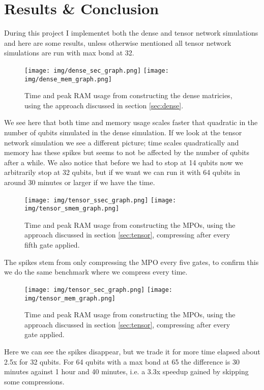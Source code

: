 \section{Results \& Conclusion}\label{sec:results}
During this project I implementet both the dense and tensor network simulations and here are some results, unless otherwise mentioned all tensor network simulations are run with max bond at 32. 
\begin{figure}[H]
    \begin{center}
        \texttt{[image: img/dense\_sec\_graph.png]}
        \texttt{[image: img/dense\_mem\_graph.png]}
    \end{center}
    \caption{Time and peak RAM usage from constructing the dense matricies, using the approach discussed in section \ref{sec:dense}.}
    \label{fig:dense_perf}
\end{figure}
\noindent
We see here that both time and memory usage scales faster that quadratic in the number of qubits simulated in the dense simulation. If we look at the tensor network simulation we see a different picture; time scales quadratically and memory has these spikes but seems to not be affected by the number of qubits after a while. We also notice that before we had to stop at 14 qubits now we arbitrarily stop at 32 qubits, but if we want we can run it with 64 qubits in around 30 minutes or larger if we have the time. 
\begin{figure}[H]
    \begin{center}
        \texttt{[image: img/tensor\_ssec\_graph.png]}
        \texttt{[image: img/tensor\_smem\_graph.png]}
    \end{center}
    \caption{Time and peak RAM usage from constructing the MPOs, using the approach discussed in section \ref{sec:tensor}, compressing after every fifth gate applied.}
    \label{fig:stensor_perf}
\end{figure}
\noindent
The spikes stem from only compressing the MPO every five gates, to confirm this we do the same benchmark where we compress every time. 
\begin{figure}[H]
    \begin{center}
        \texttt{[image: img/tensor\_sec\_graph.png]}
        \texttt{[image: img/tensor\_mem\_graph.png]}
    \end{center}
    \caption{Time and peak RAM usage from constructing the MPOs, using the approach discussed in section \ref{sec:tensor}, compressing after every gate applied.}
    \label{fig:tensor_perf}
\end{figure}
\noindent
Here we can see the spikes disappear, but we trade it for more time elapsed about 2.5x for 32 qubits. For 64 qubits with a max bond at 65 the difference is 30 minutes against 1 hour and 40 minutes, i.e. a 3.3x speedup gained by skipping some compressions. 

